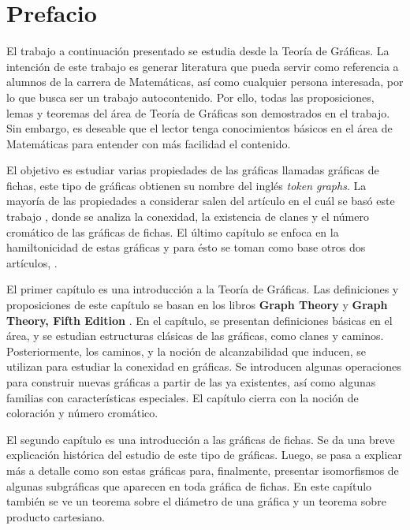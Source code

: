 \chapter{Prefacio}
\label{sec:prefacio}

El trabajo a continuaci\'on presentado se estudia desde la Teor\'ia de
Gr\'aficas. La intenci\'on de este trabajo es generar literatura que pueda
servir como referencia a alumnos de la carrera de Matem\'aticas, as\'i como
cualquier persona interesada, por lo que busca ser un trabajo autocontenido. Por
ello, todas las proposiciones, lemas y teoremas del \'area de Teor\'ia de
Gr\'aficas son demostrados en el trabajo. Sin embargo, es deseable que el lector
tenga conocimientos b\'asicos en el \'area de Matem\'aticas para entender con
m\'as facilidad el contenido. 

El objetivo es estudiar varias propiedades de las gr\'aficas llamadas gr\'aficas
de fichas, este tipo de gr\'aficas obtienen su nombre del ingl\'es \textit{token
graphs}. La mayor\'ia de las propiedades a considerar salen del art\'iculo en el
cu\'al se bas\'o este trabajo \cite{fabilaToken}, donde se analiza la conexidad,
la existencia de clanes y el n\'umero crom\'atico de las gr\'aficas de fichas.
El \'ultimo cap\'itulo se enfoca en la hamiltonicidad de estas gr\'aficas y para
\'esto se toman como base otros dos art\'iculos, \cite{adameHamilt,
riveraHamilt}. 

El primer cap\'itulo es una introducci\'on a la Teor\'ia de Gr\'aficas. Las
definiciones y proposiciones de este cap\'itulo se basan en los libros
\textbf{Graph Theory} \cite{bondy2008} y \textbf{Graph Theory, Fifth Edition}
\cite{diestel2017}. En el cap\'itulo, se presentan definiciones b\'asicas en el
\'area, y se estudian estructuras cl\'asicas de las gr\'aficas, como clanes y
caminos. Posteriormente, los caminos, y la noci\'on de alcanzabilidad que
inducen, se utilizan para estudiar la conexidad en gr\'aficas.   Se introducen
algunas operaciones para construir nuevas gr\'aficas a partir de las ya
existentes, as\'i como algunas familias con caracter\'isticas especiales.   El
cap\'itulo cierra con la noci\'on de coloraci\'on y n\'umero crom\'atico.

El segundo cap\'itulo es una introducci\'on a las gr\'aficas de fichas. Se da
una breve explicaci\'on hist\'orica del estudio de este tipo de gr\'aficas.
Luego, se pasa a explicar m\'as a detalle como son estas gr\'aficas para,
finalmente, presentar isomorfismos de algunas subgr\'aficas que aparecen en toda
gr\'afica de fichas. En este cap\'itulo tambi\'en se ve un teorema sobre el
di\'ametro de una gr\'afica y un teorema sobre producto cartesiano.

